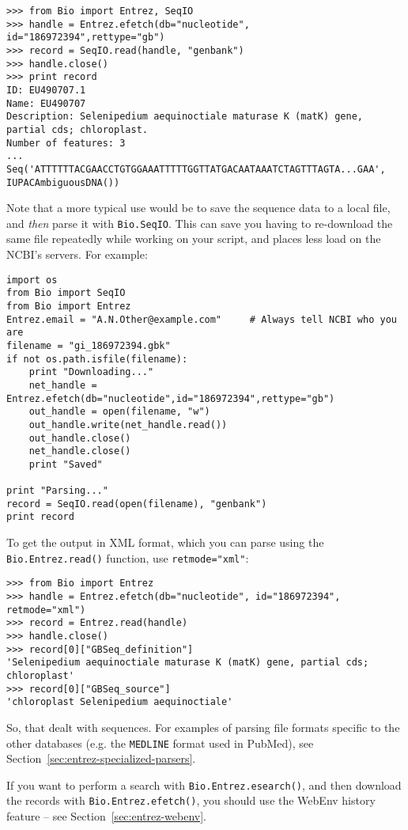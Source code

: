 \documentclass{report}
\begin{document}
\begin{verbatim}
>>> from Bio import Entrez, SeqIO
>>> handle = Entrez.efetch(db="nucleotide", id="186972394",rettype="gb")
>>> record = SeqIO.read(handle, "genbank")
>>> handle.close()
>>> print record
ID: EU490707.1
Name: EU490707
Description: Selenipedium aequinoctiale maturase K (matK) gene, partial cds; chloroplast.
Number of features: 3
...
Seq('ATTTTTTACGAACCTGTGGAAATTTTTGGTTATGACAATAAATCTAGTTTAGTA...GAA', IUPACAmbiguousDNA())\end{verbatim}

Note that a more typical use would be to save the sequence data to a local file, and \emph{then} parse it with \verb|Bio.SeqIO|.  This can save you having to re-download the same file repeatedly while working on your script, and places less load on the NCBI's servers.  For example:

\begin{verbatim}
import os
from Bio import SeqIO
from Bio import Entrez
Entrez.email = "A.N.Other@example.com"     # Always tell NCBI who you are
filename = "gi_186972394.gbk"
if not os.path.isfile(filename):
    print "Downloading..."
    net_handle = Entrez.efetch(db="nucleotide",id="186972394",rettype="gb")
    out_handle = open(filename, "w")
    out_handle.write(net_handle.read())
    out_handle.close()
    net_handle.close()
    print "Saved"

print "Parsing..."
record = SeqIO.read(open(filename), "genbank")
print record
\end{verbatim}

To get the output in XML format, which you can parse using the \verb+Bio.Entrez.read()+ function, use \verb+retmode="xml"+:

\begin{verbatim}
>>> from Bio import Entrez
>>> handle = Entrez.efetch(db="nucleotide", id="186972394", retmode="xml")
>>> record = Entrez.read(handle)
>>> handle.close()
>>> record[0]["GBSeq_definition"] 
'Selenipedium aequinoctiale maturase K (matK) gene, partial cds; chloroplast'
>>> record[0]["GBSeq_source"] 
'chloroplast Selenipedium aequinoctiale'
\end{verbatim}

So, that dealt with sequences. For examples of parsing file formats specific to the other databases (e.g. the \verb+MEDLINE+ format used in PubMed), see Section~\ref{sec:entrez-specialized-parsers}.

If you want to perform a search with \verb|Bio.Entrez.esearch()|, and then download the records with \verb|Bio.Entrez.efetch()|, you should use the WebEnv history feature -- see Section~\ref{sec:entrez-webenv}.
\end{document}
